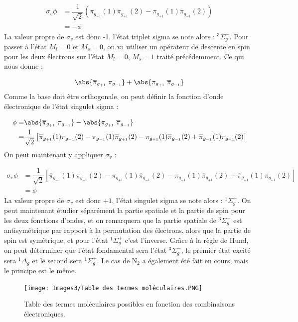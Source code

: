 \begin{align*}
    \sigma_v\phi &= \dfrac{1}{\sqrt{2}}(\pi_{g_{-1}}(1)\pi_{g_{+1}}(2)-\pi_{g_{+1}}(1)\pi_{g_{-1}}(2))\\
    &= -\phi
\end{align*}
La valeur propre de $\sigma_v$ est donc -1, l'état triplet sigma se note alors : $^3\Sigma_g^-$.
Pour passer à l'état $M_l = 0$ et $M_s = 0$, on va utiliser un opérateur de descente en spin pour les deux électrons sur l'état $M_l = 0$, $M_s = 1$ traité précédemment. Ce qui nous donne :

\[
    \abs{\overline{\pi}_{g_{+1}}\;\pi_{g_{-1}}} + \abs{\pi_{g_{+1}}\;\overline{\pi}_{g_{-1}}}
\]
Comme la base doit être orthogonale, on peut définir la fonction d'onde électronique de l'état singulet sigma :

\begin{align*}
    \phi =& \abs{\overline{\pi}_{g_{+1}}\;\pi_{g_{-1}}} - \abs{\pi_{g_{+1}}\;\overline{\pi}_{g_{-1}}}\\
    =& \dfrac{1}{\sqrt{2}}\left[\overline{\pi}_{g_{+1}}(1)\pi_{g_{-1}}(2) - \pi_{g_{-1}}(1)\overline{\pi}_{g_{+1}}(2) - \pi_{g_{+1}}(1)\overline{\pi}_{g_{-1}}(2) + \overline{\pi}_{g_{-1}}(1)\pi_{g_{+1}}(2)\right]
\end{align*}
On peut maintenant y appliquer $\sigma_v$ :

\begin{align*}
    \sigma_v\phi &= \dfrac{1}{\sqrt{2}}\left[\overline{\pi}_{g_{-1}}(1)\pi_{g_{+1}}(2) - \pi_{g_{+1}}(1)\overline{\pi}_{g_{-1}}(2) - \pi_{g_{-1}}(1)\overline{\pi}_{g_{+1}}(2) + \overline{\pi}_{g_{+1}}(1)\pi_{g_{-1}}(2)\right]\\
    &= \phi
\end{align*}
La valeur propre de $\sigma_v$ est donc $+1$, l'état singulet sigma se note alors : $^1\Sigma_g^+$.
On peut maintenant étudier séparément la partie spatiale et la partie de spin pour les deux fonctions d'ondes, et on remarquera que la partie spatiale de $^3\Sigma_g^-$ est antisymétrique par rapport à la permutation des électrons, alors que la partie de spin est symétrique, et pour l'état $^1\Sigma^+_g$ c'est l'inverse.
Grâce à la règle de Hund, on peut déterminer que l'état fondamental sera l'état $^3\Sigma_g^-$, le premier état excité sera $^1\Delta_g$ et le second sera $^1\Sigma^+_g$.
Le cas de N$_2$ a également été fait en cours, mais le principe est le même.
\begin{figure}
    \centering
    \texttt{[image: Images3/Table des termes moléculaires.PNG]}
    \caption{Table des termes moléculaires possibles en fonction des combinaisons électroniques.}
    \label{fig:termes_mol}
\end{figure}



